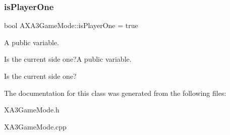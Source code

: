 \subsubsection{\texorpdfstring{is\+Player\+One}{isPlayerOne}}
{\footnotesize\ttfamily bool A\+X\+A3\+Game\+Mode\+::is\+Player\+One = true\hspace{0.3cm}{\ttfamily [protected]}}



A public variable. 

Is the current side one?A public variable.

Is the current side one? 

The documentation for this class was generated from the following files\+:\begin{DoxyCompactItemize}
\item 
X\+A3\+Game\+Mode.\+h\item 
X\+A3\+Game\+Mode.\+cpp\end{DoxyCompactItemize}
